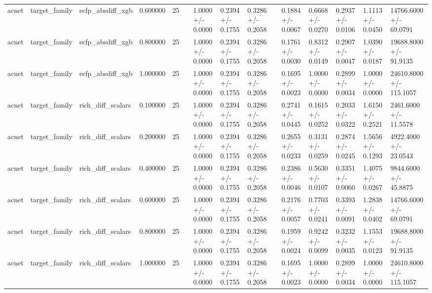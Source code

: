 \begin{longtable}{lllrlllllllllll}
acnet & target\_family & ecfp\_absdiff\_xgb & 0.600000 & 25 &  & 1.0000 +/- 0.0000 & 0.2394 +/- 0.1755 & 0.3286 +/- 0.2058 &  & 0.1884 +/- 0.0067 & 0.6668 +/- 0.0270 & 0.2937 +/- 0.0106 & 1.1113 +/- 0.0450 & 14766.6000 +/- 69.0791 \\
acnet & target\_family & ecfp\_absdiff\_xgb & 0.800000 & 25 &  & 1.0000 +/- 0.0000 & 0.2394 +/- 0.1755 & 0.3286 +/- 0.2058 &  & 0.1761 +/- 0.0030 & 0.8312 +/- 0.0149 & 0.2907 +/- 0.0047 & 1.0390 +/- 0.0187 & 19688.8000 +/- 91.9135 \\
acnet & target\_family & ecfp\_absdiff\_xgb & 1.000000 & 25 &  & 1.0000 +/- 0.0000 & 0.2394 +/- 0.1755 & 0.3286 +/- 0.2058 &  & 0.1695 +/- 0.0023 & 1.0000 +/- 0.0000 & 0.2899 +/- 0.0034 & 1.0000 +/- 0.0000 & 24610.8000 +/- 115.1057 \\
acnet & target\_family & rich\_diff\_scalars & 0.100000 & 25 &  & 1.0000 +/- 0.0000 & 0.2394 +/- 0.1755 & 0.3286 +/- 0.2058 &  & 0.2741 +/- 0.0445 & 0.1615 +/- 0.0252 & 0.2033 +/- 0.0322 & 1.6150 +/- 0.2521 & 2461.6000 +/- 11.5578 \\
acnet & target\_family & rich\_diff\_scalars & 0.200000 & 25 &  & 1.0000 +/- 0.0000 & 0.2394 +/- 0.1755 & 0.3286 +/- 0.2058 &  & 0.2655 +/- 0.0233 & 0.3131 +/- 0.0259 & 0.2874 +/- 0.0245 & 1.5656 +/- 0.1293 & 4922.4000 +/- 23.0543 \\
acnet & target\_family & rich\_diff\_scalars & 0.400000 & 25 &  & 1.0000 +/- 0.0000 & 0.2394 +/- 0.1755 & 0.3286 +/- 0.2058 &  & 0.2386 +/- 0.0046 & 0.5630 +/- 0.0107 & 0.3351 +/- 0.0060 & 1.4075 +/- 0.0267 & 9844.6000 +/- 45.8875 \\
acnet & target\_family & rich\_diff\_scalars & 0.600000 & 25 &  & 1.0000 +/- 0.0000 & 0.2394 +/- 0.1755 & 0.3286 +/- 0.2058 &  & 0.2176 +/- 0.0057 & 0.7703 +/- 0.0241 & 0.3393 +/- 0.0091 & 1.2838 +/- 0.0402 & 14766.6000 +/- 69.0791 \\
acnet & target\_family & rich\_diff\_scalars & 0.800000 & 25 &  & 1.0000 +/- 0.0000 & 0.2394 +/- 0.1755 & 0.3286 +/- 0.2058 &  & 0.1959 +/- 0.0024 & 0.9242 +/- 0.0099 & 0.3232 +/- 0.0035 & 1.1553 +/- 0.0123 & 19688.8000 +/- 91.9135 \\
acnet & target\_family & rich\_diff\_scalars & 1.000000 & 25 &  & 1.0000 +/- 0.0000 & 0.2394 +/- 0.1755 & 0.3286 +/- 0.2058 &  & 0.1695 +/- 0.0023 & 1.0000 +/- 0.0000 & 0.2899 +/- 0.0034 & 1.0000 +/- 0.0000 & 24610.8000 +/- 115.1057 \\
\end{longtable}
